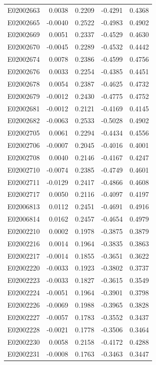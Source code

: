 \documentclass[11pt, a4paper]{article}
\begin{document}
\begin{longtable}{lrrrr}
E02002663 & 0.0038 & 0.2209 & -0.4291 & 0.4368 \\
E02002665 & -0.0040 & 0.2522 & -0.4983 & 0.4902 \\
E02002669 & 0.0051 & 0.2337 & -0.4529 & 0.4630 \\
E02002670 & -0.0045 & 0.2289 & -0.4532 & 0.4442 \\
E02002674 & 0.0078 & 0.2386 & -0.4599 & 0.4756 \\
E02002676 & 0.0033 & 0.2254 & -0.4385 & 0.4451 \\
E02002678 & 0.0054 & 0.2387 & -0.4625 & 0.4732 \\
E02002679 & -0.0012 & 0.2430 & -0.4775 & 0.4752 \\
E02002681 & -0.0012 & 0.2121 & -0.4169 & 0.4145 \\
E02002682 & -0.0063 & 0.2533 & -0.5028 & 0.4902 \\
E02002705 & 0.0061 & 0.2294 & -0.4434 & 0.4556 \\
E02002706 & -0.0007 & 0.2045 & -0.4016 & 0.4001 \\
E02002708 & 0.0040 & 0.2146 & -0.4167 & 0.4247 \\
E02002710 & -0.0074 & 0.2385 & -0.4749 & 0.4601 \\
E02002711 & -0.0129 & 0.2417 & -0.4866 & 0.4608 \\
E02002717 & 0.0050 & 0.2116 & -0.4097 & 0.4197 \\
E02006813 & 0.0112 & 0.2451 & -0.4691 & 0.4916 \\
E02006814 & 0.0162 & 0.2457 & -0.4654 & 0.4979 \\
E02002210 & 0.0002 & 0.1978 & -0.3875 & 0.3879 \\
E02002216 & 0.0014 & 0.1964 & -0.3835 & 0.3863 \\
E02002217 & -0.0014 & 0.1855 & -0.3651 & 0.3622 \\
E02002220 & -0.0033 & 0.1923 & -0.3802 & 0.3737 \\
E02002223 & -0.0033 & 0.1827 & -0.3615 & 0.3549 \\
E02002224 & -0.0051 & 0.1964 & -0.3901 & 0.3798 \\
E02002226 & -0.0069 & 0.1988 & -0.3965 & 0.3828 \\
E02002227 & -0.0057 & 0.1783 & -0.3552 & 0.3437 \\
E02002228 & -0.0021 & 0.1778 & -0.3506 & 0.3464 \\
E02002230 & 0.0058 & 0.2158 & -0.4172 & 0.4288 \\
E02002231 & -0.0008 & 0.1763 & -0.3463 & 0.3447 \\

\end{longtable}
\end{document}
